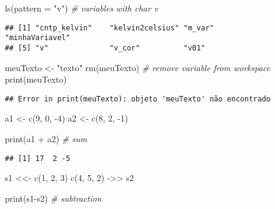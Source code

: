 \documentclass[
]{article}
\newenvironment{Shaded}{\begin{snugshade}}{\end{snugshade}}
\newcommand{\AttributeTok}[1]{\textcolor[rgb]{0.77,0.63,0.00}{#1}}
\newcommand{\CommentTok}[1]{\textcolor[rgb]{0.56,0.35,0.01}{\textit{#1}}}
\newcommand{\DecValTok}[1]{\textcolor[rgb]{0.00,0.00,0.81}{#1}}
\newcommand{\FunctionTok}[1]{\textcolor[rgb]{0.00,0.00,0.00}{#1}}
\newcommand{\NormalTok}[1]{#1}
\newcommand{\OtherTok}[1]{\textcolor[rgb]{0.56,0.35,0.01}{#1}}
\newcommand{\SpecialCharTok}[1]{\textcolor[rgb]{0.00,0.00,0.00}{#1}}
\newcommand{\StringTok}[1]{\textcolor[rgb]{0.31,0.60,0.02}{#1}}
\begin{document}
\begin{Shaded}
\begin{Highlighting}[]
\FunctionTok{ls}\NormalTok{(}\AttributeTok{pattern =} \StringTok{"v"}\NormalTok{) }\CommentTok{\# variables with char v}
\end{Highlighting}
\end{Shaded}

\begin{verbatim}
## [1] "cntp_kelvin"    "kelvin2celsius" "m_var"          "minhaVariavel" 
## [5] "v"              "v_cor"          "v01"
\end{verbatim}

\begin{Shaded}
\begin{Highlighting}[]
\NormalTok{meuTexto }\OtherTok{\textless{}{-}} \StringTok{"texto"}
\FunctionTok{rm}\NormalTok{(meuTexto) }\CommentTok{\# remove variable from workspace}
\FunctionTok{print}\NormalTok{(meuTexto)}
\end{Highlighting}
\end{Shaded}

\begin{verbatim}
## Error in print(meuTexto): objeto 'meuTexto' não encontrado
\end{verbatim}

\begin{Shaded}
\begin{Highlighting}[]
\NormalTok{a1 }\OtherTok{\textless{}{-}} \FunctionTok{c}\NormalTok{(}\DecValTok{9}\NormalTok{, }\DecValTok{0}\NormalTok{, }\SpecialCharTok{{-}}\DecValTok{4}\NormalTok{)}
\NormalTok{a2 }\OtherTok{\textless{}{-}} \FunctionTok{c}\NormalTok{(}\DecValTok{8}\NormalTok{, }\DecValTok{2}\NormalTok{, }\SpecialCharTok{{-}}\DecValTok{1}\NormalTok{)}

\FunctionTok{print}\NormalTok{(a1 }\SpecialCharTok{+}\NormalTok{ a2) }\CommentTok{\# sum}
\end{Highlighting}
\end{Shaded}

\begin{verbatim}
## [1] 17  2 -5
\end{verbatim}

\begin{Shaded}
\begin{Highlighting}[]
\NormalTok{s1 }\OtherTok{\textless{}\textless{}{-}} \FunctionTok{c}\NormalTok{(}\DecValTok{1}\NormalTok{, }\DecValTok{2}\NormalTok{, }\DecValTok{3}\NormalTok{)}
\FunctionTok{c}\NormalTok{(}\DecValTok{4}\NormalTok{, }\DecValTok{5}\NormalTok{, }\DecValTok{2}\NormalTok{) }\OtherTok{{-}\textgreater{}\textgreater{}}\NormalTok{ s2}

\FunctionTok{print}\NormalTok{(s1}\SpecialCharTok{{-}}\NormalTok{s2) }\CommentTok{\# subtraction}
\end{Highlighting}
\end{Shaded}
\end{document}
